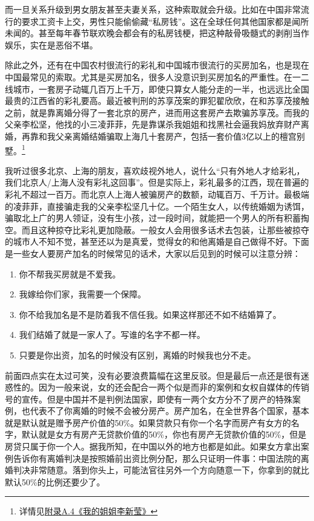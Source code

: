 而一旦关系升级到男女朋友甚至夫妻关系，这种索取就会升级。比如在中国非常流行的要求工资卡上交，男性只能偷偷藏``私房钱''。这在全球任何其他国家都是闻所未闻的。甚至每年春节联欢晚会都会有的私房钱梗，把这种敲骨吸髓式的剥削当作娱乐，实在是恶俗不堪。

除此之外，还有在中国农村很流行的彩礼和中国城市很流行的买房加名，也是现在中国最常见的索取。尤其是买房加名，很多人没意识到买房加名的严重性。在一二线城市，一套房子动辄几百万上千万，即使只算女人能分走的一半，也远远比全国最贵的江西省的彩礼要高。最近被判刑的苏享茂案的罪犯翟欣欣，在和苏享茂接触之前，就是靠离婚分得了一套北京的房产，进而用这套房产去欺骗苏享茂。而我的父亲李松坚，他找的小三凌菲菲，先是靠谋杀我姐姐和找黑社会逼我妈放弃财产离婚，再靠和我父亲离婚结婚骗取上海几十套房产，包括一套价值3亿以上的檀宫别墅。\footnote{详情见\hyperref[sister]{附录A.4《我的姐姐李新莹》}}

我听过很多北京、上海的朋友，喜欢歧视外地人，说什么``只有外地人才给彩礼，我们北京人/上海人没有彩礼这回事''。但是实际上，彩礼最多的江西，现在普遍的彩礼不超过一百万。而北京人上海人被骗房产的数额，动辄百万、千万计。最极端的凌菲菲，直接骗走我的父亲李松坚几十亿。一个陌生女人，以传统婚姻为诱饵，骗取北上广的男人领证，没有生小孩，过一段时间，就能把一个男人的所有积蓄掏空。而且这种掠夺比彩礼更加隐蔽。一般女人会用很多话术去包装，让那些被掠夺的城市人不知不觉，甚至还以为是真爱，觉得女的和他离婚是自己做得不好。下面是一些女人要房产加名的时候常见的话术，大家以后见到的时候可以注意分辨：
\begin{enumerate}
\item 你不帮我买房就是不爱我。
\item 我嫁给你们家，我需要一个保障。
\item 你不给我加名是不是防着我不信任我。如果这样那还不如不结婚算了。
\item 我们结婚了就是一家人了。写谁的名字不都一样。
\item 只要是你出资，加名的时候没有区别，离婚的时候我也分不走。
\end{enumerate}

前面四点实在太过可笑，没有必要浪费篇幅在这里反驳。但是最后一点还是很有迷惑性的。因为一般来说，女的还会配合一两个似是而非的案例和女权自媒体的传销号的宣传。但是中国并不是判例法国家，即使有一两个女方分不了房产的特殊案例，也代表不了你离婚的时候不会被分房产。房产加名，在全世界各个国家，基本就是默认就是赠予房产价值的50\%。如果贷款只有你一个名字而房产有女方的名字，默认就是女方有房产无贷款价值的50\%，你也有房产无贷款价值的50\%，但是房贷只属于你一个人。据我所知，在中国以外的地方也都是如此。如果女方拿出案例告诉你有离婚判决是按照婚前出资比例分配，那么只证明一件事：中国法院的离婚判决非常随意。落到你头上，可能法官往另外一个方向随意一下，你拿到的就比默认50\%的比例还要少了。

